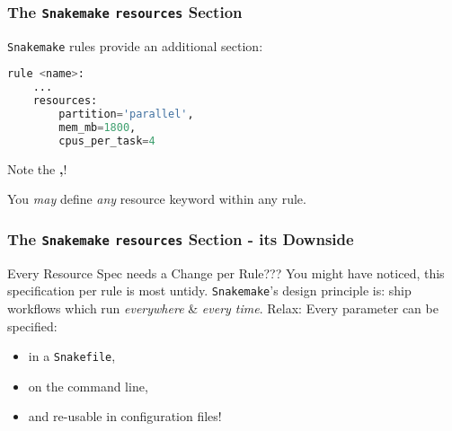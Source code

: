 \begin{frame}[fragile]
	\frametitle{The \texttt{Snakemake} \texttt{resources} Section}
	\texttt{Snakemake} rules provide an additional  section:
	\begin{lstlisting}[language=Python,style=Python]
rule <name>:
	...
	resources:
		partition='parallel',
		mem_mb=1800,
		cpus_per_task=4
	\end{lstlisting}
	\begin{hint}
		Note the \textbf{,}!
	\end{hint}
	\pause
	\begin{docs}
		You \emph{may} define \emph{any} resource keyword within any rule.
	\end{docs}
\end{frame}

\begin{frame}
	\frametitle{The \texttt{Snakemake} \texttt{resources} Section - its Downside}
	\begin{block}{Every Resource Spec needs a Change per Rule???}
		You might have noticed, this specification per rule is most untidy. \texttt{Snakemake}'s design principle is: ship workflows which run \emph{everywhere} \& \emph{every time}.
		\newline \pause
		Relax: Every parameter can be specified:
		\begin{itemize}
			\item in a \texttt{Snakefile},
			\item on the command line,
			\item and re-usable in configuration files!
		\end{itemize}
	\end{block}
\end{frame}

